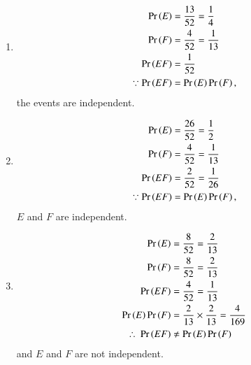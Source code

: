 	\begin{enumerate}
		\item 
			\begin{align}
				\Pr\left(E\right) &= \frac{13}{52} = \frac{1}{4} 
				\\
				\Pr\left(F\right) &= \frac{4}{52} = \frac{1}{13}\\
				\Pr\left(EF\right) &= \frac{1}{52}\\
\because \Pr\left(EF\right) &= \Pr\left(E\right)\Pr\left(F\right),
			\end{align}
the events are independent.
		\item
			\begin{align}
				\Pr\left(E\right) &= \frac{26}{52} = \frac{1}{2}
				\\
				\Pr\left(F\right) &= \frac{4}{52} = \frac{1}{13} \\
				\Pr\left(EF\right) &= \frac{2}{52} = \frac{1}{26} \\
\because \Pr\left(EF\right) &= \Pr\left(E\right)\Pr\left(F\right),
			\end{align}
			$E$ and $F$ are independent.  
		\item
			\begin{align}
				\Pr\left(E\right) &= \frac{8}{52} = \frac{2}{13} \\
				\Pr\left(F\right) &= \frac{8}{52} = \frac{2}{13}\\
				\Pr\left(EF\right) &= \frac{4}{52} = \frac{1}{13}\\
				\Pr\left(E\right)\Pr\left(F\right) &= \frac{2}{13} \times \frac{2}{13} = \frac{4}{169}\\
				\therefore~\Pr\left(EF\right) &\neq \Pr\left(E\right)\Pr\left(F\right)
			\end{align}	
			and   $E$ and $F$ are not independent.  
	\end{enumerate}
